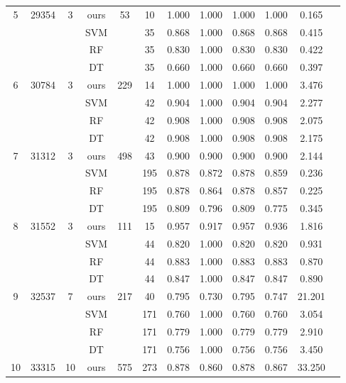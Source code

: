 \begin{table}[htbp]
\begin{tabular}{cccccccccccc}
        \midrule
        5  & 29354 & 3 & ours & 53  & 10  & 1.000 & 1.000 & 1.000 & 1.000 & 0.165 \\
           &       &   & SVM  &     & 35  & 0.868 & 1.000 & 0.868 & 0.868 & 0.415 \\
           &       &   & RF   &     & 35  & 0.830 & 1.000 & 0.830 & 0.830 & 0.422 \\
           &       &   & DT   &     & 35  & 0.660 & 1.000 & 0.660 & 0.660 & 0.397 \\
        \midrule
        6  & 30784 & 3 & ours & 229 & 14  & 1.000 & 1.000 & 1.000 & 1.000 & 3.476 \\
           &       &   & SVM  &     & 42  & 0.904 & 1.000 & 0.904 & 0.904 & 2.277 \\
           &       &   & RF   &     & 42  & 0.908 & 1.000 & 0.908 & 0.908 & 2.075 \\
           &       &   & DT   &     & 42  & 0.908 & 1.000 & 0.908 & 0.908 & 2.175 \\
        \midrule
        7  & 31312 & 3 & ours & 498 & 43  & 0.900 & 0.900 & 0.900 & 0.900 & 2.144 \\
           &       &   & SVM  &     & 195 & 0.878 & 0.872 & 0.878 & 0.859 & 0.236 \\
           &       &   & RF   &     & 195 & 0.878 & 0.864 & 0.878 & 0.857 & 0.225 \\
           &       &   & DT   &     & 195 & 0.809 & 0.796 & 0.809 & 0.775 & 0.345 \\
\midrule
        8  & 31552 & 3 & ours & 111 & 15  & 0.957 & 0.917 & 0.957 & 0.936 & 1.816 \\
           &       &   & SVM  &     & 44  & 0.820 & 1.000 & 0.820 & 0.820 & 0.931 \\
           &       &   & RF   &     & 44  & 0.883 & 1.000 & 0.883 & 0.883 & 0.870 \\
           &       &   & DT   &     & 44  & 0.847 & 1.000 & 0.847 & 0.847 & 0.890 \\
        \midrule
        9  & 32537 & 7 & ours & 217 & 40  & 0.795 & 0.730 & 0.795 & 0.747 & 21.201 \\
           &       &   & SVM  &     & 171 & 0.760 & 1.000 & 0.760 & 0.760 & 3.054 \\
           &       &   & RF   &     & 171 & 0.779 & 1.000 & 0.779 & 0.779 & 2.910 \\
           &       &   & DT   &     & 171 & 0.756 & 1.000 & 0.756 & 0.756 & 3.450 \\
        \midrule
        10 & 33315 & 10 & ours & 575 & 273 & 0.878 & 0.860 & 0.878 & 0.867 & 33.250 \\

\end{tabular}
\end{table}
